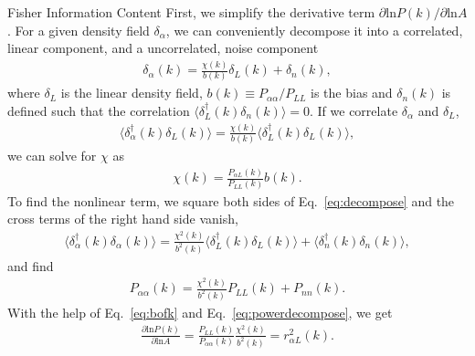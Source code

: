 \begin{section}{Fisher Information Content}
  First, we simplify the derivative term
  $\partial \mathrm{ln} P(k)/\partial\mathrm{ln} A$.  For a given density field $\delta_\alpha$, we can
  conveniently decompose it into a correlated, linear component,
  and a uncorrelated, noise component
  \begin{align}
    \delta_\alpha(k) = \frac{\chi (k)}{b (k)} \delta _L (k) + \delta_{n}(k),
    \label{eq:decompose}
  \end{align}
  where $\delta_L$ is the linear density field, $b(k)\equiv P_{\alpha\alpha}/P_{LL}$ is the
  bias and $\delta_{n}(k)$ is defined such that the correlation
  $\langle \delta_L^\dagger(k)\delta_{n}(k) \rangle=0$.  If we correlate
  $\delta_\alpha$ and $\delta_L$,
  \begin{align}
    \langle \delta_\alpha^\dagger(k)\delta_L(k) \rangle = \frac{\chi(k)}{b(k)} \langle \delta_L^\dagger(k)\delta_L(k) \rangle,
    \label{eq:correlating}
  \end{align} 
  we can solve for $\chi$ as
  \begin{align}
    \chi(k) = \frac{P _{\alpha L}(k)}{P_{LL}(k)}b(k).
    \label{eq:bofk}
  \end{align}
  To find the nonlinear term, we square both sides of Eq.~\ref{eq:decompose}
  and the cross terms of the right hand side vanish,
  \begin{align}
    \langle \delta_\alpha^\dagger(k) \delta_\alpha(k) \rangle = 
    \frac{\chi^2(k)}{b^2(k)} \langle \delta_L^\dagger(k) \delta_L(k) \rangle + \langle \delta_{n}^\dagger(k)\delta_{n}(k) \rangle,
  \end{align}
  and find
  \begin{align}
    P_{\alpha\alpha}(k) = \frac{\chi^2(k)}{b^2(k)} P_{LL}(k) + P_{nn}(k).
    \label{eq:powerdecompose}
  \end{align}
  With the help of Eq.~\ref{eq:bofk} and Eq.~\ref{eq:powerdecompose},
  we get
  \begin{align}
    \frac{\partial \mathrm{ln} P(k) }{ \partial \mathrm{ln} A}=
    \frac{P_{LL}(k)}{P_{\alpha\alpha}(k)}\frac{\chi^2(k)}{b^2(k)}=r^2_{\alpha L}(k).
  \end{align}


\end{section}
